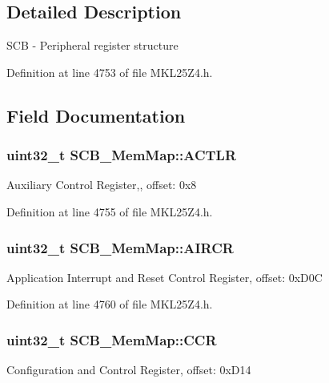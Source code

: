 \subsection{Detailed Description}
S\+CB -\/ Peripheral register structure 

Definition at line 4753 of file M\+K\+L25\+Z4.\+h.



\subsection{Field Documentation}
\subsubsection[{\texorpdfstring{A\+C\+T\+LR}{ACTLR}}]{\setlength{\rightskip}{0pt plus 5cm}uint32\+\_\+t S\+C\+B\+\_\+\+Mem\+Map\+::\+A\+C\+T\+LR}\hypertarget{struct_s_c_b___mem_map_a474a33074611146734690e48ed41282e}{}\label{struct_s_c_b___mem_map_a474a33074611146734690e48ed41282e}
Auxiliary Control Register,, offset\+: 0x8 

Definition at line 4755 of file M\+K\+L25\+Z4.\+h.

\subsubsection[{\texorpdfstring{A\+I\+R\+CR}{AIRCR}}]{\setlength{\rightskip}{0pt plus 5cm}uint32\+\_\+t S\+C\+B\+\_\+\+Mem\+Map\+::\+A\+I\+R\+CR}\hypertarget{struct_s_c_b___mem_map_a3f874ca1c6e17ae4beadac22e8ec17ec}{}\label{struct_s_c_b___mem_map_a3f874ca1c6e17ae4beadac22e8ec17ec}
Application Interrupt and Reset Control Register, offset\+: 0x\+D0C 

Definition at line 4760 of file M\+K\+L25\+Z4.\+h.

\subsubsection[{\texorpdfstring{C\+CR}{CCR}}]{\setlength{\rightskip}{0pt plus 5cm}uint32\+\_\+t S\+C\+B\+\_\+\+Mem\+Map\+::\+C\+CR}\hypertarget{struct_s_c_b___mem_map_aa6e957027d8c505047cd58101bb784aa}{}\label{struct_s_c_b___mem_map_aa6e957027d8c505047cd58101bb784aa}
Configuration and Control Register, offset\+: 0x\+D14 

